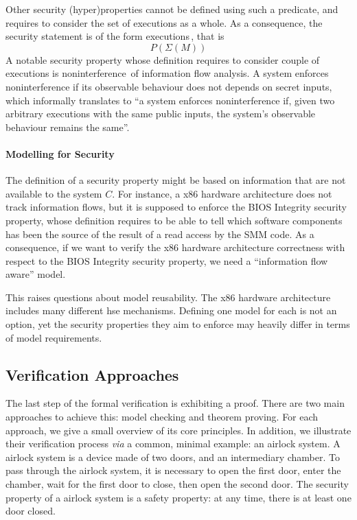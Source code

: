 Other security (hyper)properties cannot be defined using such a predicate, and
requires to consider the set of executions as a whole. As a consequence, the
security statement is of the form
executions\,\cite{clarkson2010hyperproperties}, that is
%
\[
  P(\Sigma(M))
\]
%
A notable security property whose definition requires to consider couple of
executions is noninterference\,\cite{goguen1982security} of information flow
analysis.
%
A system enforces noninterference if its observable behaviour does not depends
on secret inputs, which informally translates to ``a system enforces
noninterference if, given two arbitrary executions with the same public inputs,
the system's observable behaviour remains the same''.

\paragraph{Modelling for Security}
%
The definition of a security property might be based on information that are not
available to the system $C$.
%
For instance, a x86 hardware architecture does not track information flows, but
it is supposed to enforce the BIOS Integrity security property, whose definition
requires to be able to tell which software components has been the source of the
result of a read access by the SMM code.
%
As a consequence, if we want to verify the x86 hardware architecture correctness
with respect to the BIOS Integrity security property, we need a ``information
flow aware'' model.

This raises questions about model reusability.
%
The x86 hardware architecture includes many different \ac{hse} mechanisms.
%
Defining one model for each is not an option, yet the security properties they
aim to enforce may heavily differ in terms of model requirements.

\subsection{Verification Approaches}
\label{subsec:state:approaches}

The last step of the formal verification is exhibiting a proof.
%
There are two main approaches to achieve this: model checking and theorem
proving.
%
For each approach, we give a small overview of its core principles.
%
In addition, we illustrate their verification process \emph{via} a common,
minimal example: an airlock system.
%
A airlock system is a device made of two doors, and an intermediary chamber.
%
To pass through the airlock system, it is necessary to open the first door,
enter the chamber, wait for the first door to close, then open the second door.
%
The security property of a airlock system is a safety property: at any time,
there is at least one door closed.

